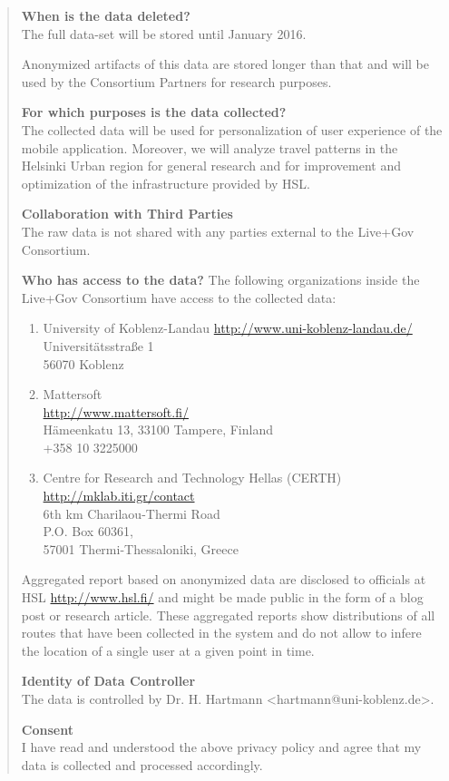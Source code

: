 \begin{quote}
\textbf{When is the data deleted?}\\
The full data-set will be stored until January 2016.

Anonymized artifacts of this data are stored longer than that and will
be used by the Consortium Partners for research purposes.

\textbf{For which purposes is the data collected?}\\
The collected data will be used for personalization of user experience
of the mobile application.  Moreover, we will analyze travel patterns
in the Helsinki Urban region for general research and for improvement
and optimization of the infrastructure provided by HSL.

\textbf{Collaboration with Third Parties}\\
The raw data is not shared with any parties external to the Live+Gov
Consortium.

\textbf{Who has access to the data?}
The following organizations inside the Live+Gov Consortium have access
to the collected data:
\begin{enumerate}
\item University of Koblenz-Landau
\url{http://www.uni-koblenz-landau.de/}\\
Universitätsstraße 1\\
56070 Koblenz

\item Mattersoft \\
\url{http://www.mattersoft.fi/} \\
Hämeenkatu 13, 33100 Tampere, Finland\\
+358 10 3225000

\item Centre for Research and Technology Hellas (CERTH)\\
\url{http://mklab.iti.gr/contact}\\
6th km Charilaou-Thermi Road\\
P.O. Box 60361,\\
57001 Thermi-Thessaloniki, Greece
\end{enumerate}

Aggregated report based on anonymized data are disclosed to officials
at HSL \url{http://www.hsl.fi/} and might be made public in the form
of a blog post or research article.  These aggregated reports show
distributions of all routes that have been collected in the system and
do not allow to infere the location of a single user at a given point
in time.

\textbf{Identity of Data Controller}\\
The data is controlled by Dr. H.  Hartmann <hartmann@uni-koblenz.de>.

\textbf{Consent}\\
I have read and understood the above privacy policy and agree that my data is collected and processed accordingly.
\end{quote}

